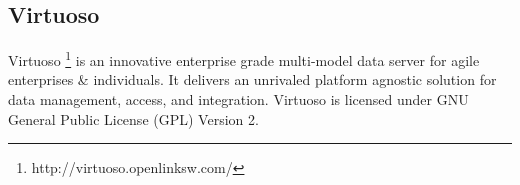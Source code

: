 \subsection{Virtuoso}
\label{sec:Sesame}
Virtuoso \footnote{http://virtuoso.openlinksw.com/} is an innovative enterprise grade multi-model data server for agile enterprises
\& individuals. It delivers an unrivaled platform agnostic solution for data management, access, and integration.
Virtuoso is licensed under GNU General Public License (GPL) Version 2.
